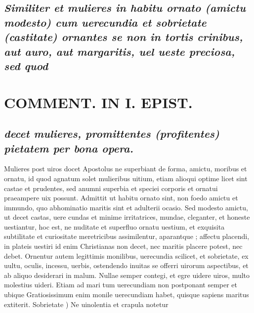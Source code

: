 \documentclass{article}
\begin{document}
\begin{pages}
\subsection*{\textit{Similiter et mulieres in habitu ornato (amictu modesto) cum uerecundia et sobrietate (castitate) ornantes se non in tortis crinibus, aut auro, aut margaritis, uel ueste preciosa, sed quod }}
\section*{COMMENT. IN I. EPIST. }
\marginpar{[ p.57 ]}
{}
\subsection*{\textit{decet mulieres, promittentes (profitentes) pietatem per bona opera. }}\pstart Mulieres post uiros docet Apostolus ne superbiant de forma, amictu, moribus et ornatu, id quod agnatum solet mulieribus uitium, etiam alioqui optime licet sint castae et prudentes, sed anumni superbia et speciei corporis et ornatui praeampere uix possunt. Admittit ut habitu ornato sint, non foedo amictu et immundo, quo abhominatio maritis sint et adulterii ocasio. Sed modesto amictu, ut decet castas, uere cundas et minime irritatrices, mundae, cleganter, et honeste uestiantur, hoc est, ne nuditate et superfluo ornatu uestium, et exquisita subtilitate et curiositate meretricibus assimilentur, aparantque ; affectu placendi, in plateis uestiri id enim Christianas non decet, nec maritis placere potest, nec debet. Ornentur autem legittimis monilibus, uerecundia scilicet, et sobrietate, ex uultu, oculis, incessu, uerbis, ostendendo inuitas se offerri uirorum aspectibus, et ab aliquo desiderari in malum. Nullae semper contegi, et egre uidere uiros, multo molestius uideri. Etiam ad mari tum uerecundiam non postponant semper et ubique  Gratiosissimum enim monile uerecundiam habet, quisque sapiens maritus extiterit.  \pend\pstart Sobrietate ) Ne uinolentia et crapula notetur  \pend

\end{pages}
\end{document}
